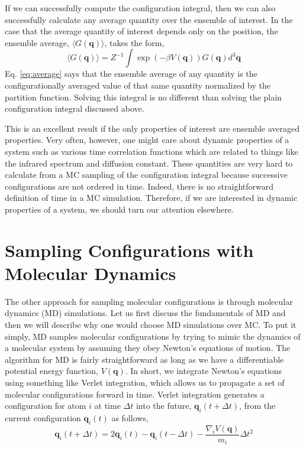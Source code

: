 \documentclass[11pt, proquest]{uwthesis}[2020/02/24]
\begin{document}
\par If we can successfully compute the configuration integral, then we can also successfully calculate any average quantity over the ensemble of interest. In the case that the average quantity of interest depends only on the position, the ensemble average, $\langle G(\mathbf{q})\rangle$, takes the form,
\begin{equation}
    \langle G(\mathbf{q})\rangle=Z^{-1}\int \exp\left(-\beta V(\mathbf{q})\right)G(\mathbf{q})d^3\mathbf{q}
    \label{eq:average}
\end{equation}
Eq. \ref{eq:average} says that the ensemble average of any quantity is the configurationally averaged value of that same quantity normalized by the partition function. Solving this integral is no different than solving the plain configuration integral discussed above.

\par This is an excellent result if the only properties of interest are ensemble averaged properties. Very often, however, one might care about dynamic properties of a system such as various time correlation functions which are related to things like the infrared spectrum and diffusion constant. These quantities are very hard to calculate from a MC sampling of the configuration integral because successive configurations are not ordered in time. Indeed, there is no straightforward definition of time in a MC simulation. Therefore, if we are interested in dynamic properties of a system, we should turn our attention elsewhere.

\section{Sampling Configurations with Molecular Dynamics}
The other approach for sampling molecular configurations is through molecular dynamics (MD) simulations. Let us first discuss the fundamentals of MD and then we will describe why one would choose MD simulations over MC. To put it simply, MD samples molecular configurations by trying to mimic the dynamics of a molecular system by assuming they obey Newton's equations of motion. The algorithm for MD is fairly straightforward as long as we have a differentiable potential energy function, $V(\mathbf{q})$. In short, we integrate Newton's equations using something like Verlet integration\autocite{verlet_computer_1967}, which allows us to propagate a set of molecular configurations forward in time. Verlet integration generates a configuration for atom $i$ at time $\Delta t$ into the future, $\mathbf{q}_i(t+\Delta t)$, from the current configuration $\mathbf{q}_i(t)$ as follows,
\begin{equation}
    \mathbf{q}_i(t+\Delta t)=2\mathbf{q}_i(t) - \mathbf{q}_i(t-\Delta t) -\frac{\nabla_i V(\mathbf{q})}{m_i}\Delta t^2
    \label{eq:verlet}
\end{equation}
\end{document}
